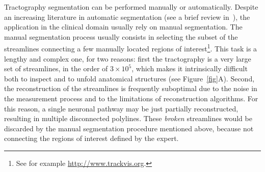 Tractography segmentation can be performed manually or
automatically. Despite an increasing literature in automatic
segmentation (see a brief review
in~\cite{wang2011tractography}), the
application in the clinical domain usually rely on manual
segmentation. The manual segmentation process usually consists in
selecting the subset of the streamlines connecting a few manually
located regions of interest\footnote{See for example \url{http://www.trackvis.org}.}. This task is a lengthy and complex one,
for two reasons: first the tractography is a very large set of
streamlines, in the order of $3 \times 10^5$, which makes it
intrinsically difficult both to inspect and to unfold anatomical
structures (see Figure~\ref{fig}A). Second, the reconstruction of the
streamlines is frequently suboptimal due to the noise in the
measurement process and to the limitations of reconstruction
algorithms. For this reason, a single neuronal pathway may be just
partially reconstructed, resulting in multiple disconnected
polylines. These \emph{broken} streamlines would be discarded by the
manual segmentation procedure mentioned above, because not
connecting the regions of interest defined by the expert.


